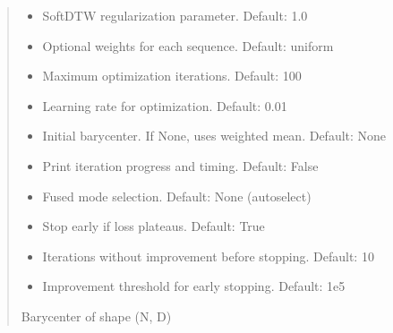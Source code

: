\documentclass[letterpaper,10pt,english]{sphinxmanual}
\begin{document}
\begin{fulllineitems}
\begin{quote}
\begin{description}
\begin{itemize}
\item {} 
\sphinxAtStartPar
{} \textendash{} SoftDTW regularization parameter. Default: 1.0

\item {} 
\sphinxAtStartPar
{} \textendash{} Optional weights for each sequence. Default: uniform

\item {} 
\sphinxAtStartPar
{} \textendash{} Maximum optimization iterations. Default: 100

\item {} 
\sphinxAtStartPar
{} \textendash{} Learning rate for optimization. Default: 0.01

\item {} 
\sphinxAtStartPar
{} \textendash{} Initial barycenter. If None, uses weighted mean. Default: None

\item {} 
\sphinxAtStartPar
{} \textendash{} Print iteration progress and timing. Default: False

\item {} 
\sphinxAtStartPar
{} \textendash{} Fused mode selection. Default: None (auto\sphinxhyphen{}select)

\item {} 
\sphinxAtStartPar
{} \textendash{} Stop early if loss plateaus. Default: True

\item {} 
\sphinxAtStartPar
{} \textendash{} Iterations without improvement before stopping. Default: 10

\item {} 
\sphinxAtStartPar
{} \textendash{} Improvement threshold for early stopping. Default: 1e\sphinxhyphen{}5

\end{itemize}

\sphinxAtStartPar
Barycenter of shape (N, D)

\end{description}\end{quote}

\end{fulllineitems}
\end{document}
